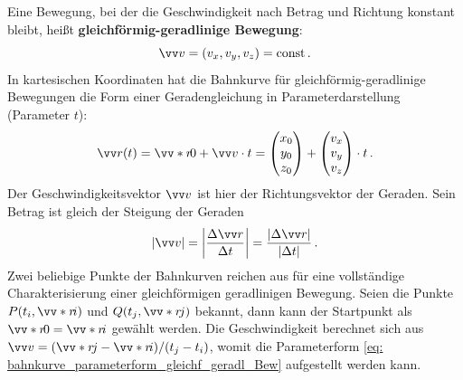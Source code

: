 Eine Bewegung, bei der die Geschwindigkeit nach Betrag und Richtung konstant bleibt, heißt \textbf{gleichförmig-geradlinige Bewegung}:
\begin{equation}
    \ivec{v}=(v_{x},v_{y},v_{z})= \const\mDot
\end{equation}
In kartesischen Koordinaten hat die Bahnkurve für gleichförmig-geradlinige Bewegungen die Form einer Geradengleichung in Parameterdarstellung (Parameter $t$):
\begin{equation}\label{eq: bahnkurve_parameterform_gleichf_geradl_Bew}
    \ivec{r}(t) = \ivecS{r}{0}+\ivec{v} \cdot t =
    \icolThree{x_0}{y_0}{z_0} + \icolThree{v_x}{v_y}{v_z} \cdot t\mDot
\end{equation}
Der Geschwindigkeitsvektor $\ivec{v}$ ist hier der Richtungsvektor der Geraden. Sein Betrag ist gleich der Steigung der Geraden 
\begin{equation}
    |\ivec{v}| = \left| \frac{\Delta \ivec{r}}{\Delta t}\right| = \frac{|\Delta \ivec{r}|}{|\Delta t|} \mDot
\end{equation}
Zwei beliebige Punkte der Bahnkurven reichen aus für eine vollständige Charakterisierung einer gleichförmigen geradlinigen Bewegung. Seien die Punkte $P(t_i, \ivecS{r}{i})$ und $Q(t_j, \ivecS{r}{j})$ bekannt, dann kann der Startpunkt als $\ivecS{r}{0} = \ivecS{r}{i}$ gewählt werden. Die Geschwindigkeit berechnet sich aus $\ivec{v} = (\ivecS{r}{j} - \ivecS{r}{i})/(t_j-t_i)$, womit die Parameterform \cref{eq: bahnkurve_parameterform_gleichf_geradl_Bew} aufgestellt werden kann.
